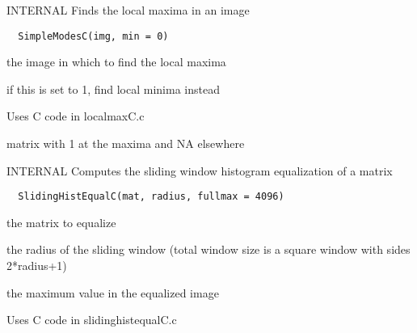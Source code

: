 \documentclass[a4paper]{book}
\begin{document}
%
\begin{Description}\relax
INTERNAL Finds the local maxima in an image
\end{Description}
%
\begin{Usage}
\begin{verbatim}
  SimpleModesC(img, min = 0)
\end{verbatim}
\end{Usage}
%
\begin{Arguments}
\begin{ldescription}
\item[\code{img}] the image in which to find the local maxima

\item[\code{min}] if this is set to 1, find local minima
instead
\end{ldescription}
\end{Arguments}
%
\begin{Details}\relax
Uses C code in localmaxC.c
\end{Details}
%
\begin{Value}
matrix with 1 at the maxima and NA elsewhere
\end{Value}
%
\begin{Description}\relax
INTERNAL Computes the sliding window histogram
equalization of a matrix
\end{Description}
%
\begin{Usage}
\begin{verbatim}
  SlidingHistEqualC(mat, radius, fullmax = 4096)
\end{verbatim}
\end{Usage}
%
\begin{Arguments}
\begin{ldescription}
\item[\code{mat}] the matrix to equalize

\item[\code{radius}] the radius of the sliding window (total
window size is a square window with sides 2*radius+1)

\item[\code{fullmax}] the maximum value in the equalized image
\end{ldescription}
\end{Arguments}
%
\begin{Details}\relax
Uses C code in slidinghistequalC.c
\end{Details}
\end{document}
